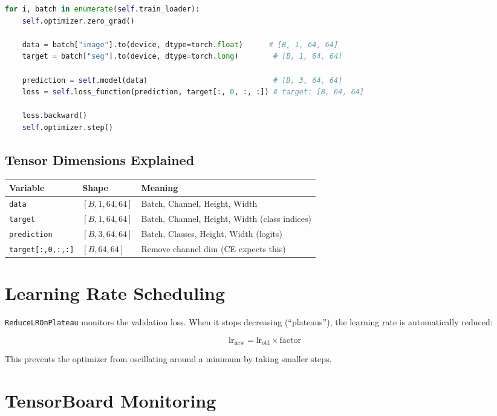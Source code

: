 \documentclass[12pt,a4paper]{report}
\begin{document}
\begin{lstlisting}[language=Python, caption=Core training step]
for i, batch in enumerate(self.train_loader):
    self.optimizer.zero_grad()
    
    data = batch["image"].to(device, dtype=torch.float)      # [B, 1, 64, 64]
    target = batch["seg"].to(device, dtype=torch.long)        # [B, 1, 64, 64]
    
    prediction = self.model(data)                             # [B, 3, 64, 64]
    loss = self.loss_function(prediction, target[:, 0, :, :]) # target: [B, 64, 64]
    
    loss.backward()
    self.optimizer.step()
\end{lstlisting}

\subsection{Tensor Dimensions Explained}

\begin{table}[H]
\centering
\begin{tabular}{lll}
\toprule
\textbf{Variable} & \textbf{Shape} & \textbf{Meaning} \\
\midrule
\texttt{data} & $[B, 1, 64, 64]$ & Batch, Channel, Height, Width \\
\texttt{target} & $[B, 1, 64, 64]$ & Batch, Channel, Height, Width (class indices) \\
\texttt{prediction} & $[B, 3, 64, 64]$ & Batch, Classes, Height, Width (logits) \\
\texttt{target[:,0,:,:]} & $[B, 64, 64]$ & Remove channel dim (CE expects this) \\
\bottomrule
\end{tabular}
\end{table}

\section{Learning Rate Scheduling}

\texttt{ReduceLROnPlateau} monitors the validation loss. When it stops decreasing (``plateaus''), the learning rate is automatically reduced:

$$\text{lr}_{\text{new}} = \text{lr}_{\text{old}} \times \text{factor}$$

This prevents the optimizer from oscillating around a minimum by taking smaller steps.

\section{TensorBoard Monitoring}
\end{document}
